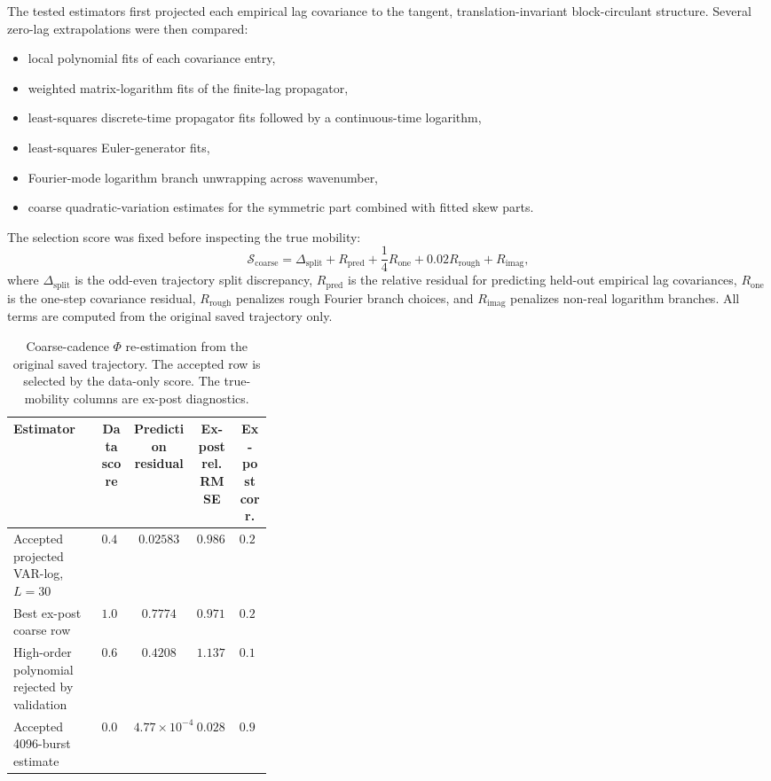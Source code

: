 \documentclass[11pt]{article}
\begin{document}
The tested estimators first projected each empirical lag covariance to the tangent, translation-invariant block-circulant structure.  Several zero-lag extrapolations were then compared:
\begin{itemize}
    \item local polynomial fits of each covariance entry,
    \item weighted matrix-logarithm fits of the finite-lag propagator,
    \item least-squares discrete-time propagator fits followed by a continuous-time logarithm,
    \item least-squares Euler-generator fits,
    \item Fourier-mode logarithm branch unwrapping across wavenumber,
    \item coarse quadratic-variation estimates for the symmetric part combined with fitted skew parts.
\end{itemize}
The selection score was fixed before inspecting the true mobility:
\begin{equation}
    \mathcal S_{\mathrm{coarse}}
    =
    \Delta_{\mathrm{split}}
    +
    R_{\mathrm{pred}}
    +
    \frac14 R_{\mathrm{one}}
    +
    0.02 R_{\mathrm{rough}}
    +
    R_{\mathrm{imag}},
\end{equation}
where \(\Delta_{\mathrm{split}}\) is the odd-even trajectory split discrepancy, \(R_{\mathrm{pred}}\) is the relative residual for predicting held-out empirical lag covariances, \(R_{\mathrm{one}}\) is the one-step covariance residual, \(R_{\mathrm{rough}}\) penalizes rough Fourier branch choices, and \(R_{\mathrm{imag}}\) penalizes non-real logarithm branches.  All terms are computed from the original saved trajectory only.

\begin{table}[tbp]
\centering
\caption{Coarse-cadence \(\Phi\) re-estimation from the original saved trajectory.  The accepted row is selected by the data-only score.  The true-mobility columns are ex-post diagnostics.}
\label{tab:coarse_phi}
\footnotesize
\begin{tabular}{@{}>{\raggedright\arraybackslash}p{0.34\linewidth}cccc@{}}
\toprule
Estimator & Data score & Prediction residual & Ex-post rel. RMSE & Ex-post corr. \\
\midrule
Accepted projected VAR-log, \(L=30\) & \(0.4127\) & \(0.02583\) & \(0.9864\) & \(0.2015\) \\
Best ex-post coarse row & \(1.0417\) & \(0.7774\) & \(0.9710\) & \(0.2400\) \\
High-order polynomial rejected by validation & \(0.6522\) & \(0.4208\) & \(1.1371\) & \(0.1945\) \\
Accepted 4096-burst estimate & \(0.04127\) & \(4.77\times10^{-4}\) & \(0.02867\) & \(0.99965\) \\
\bottomrule
\end{tabular}
\end{table}
\end{document}
